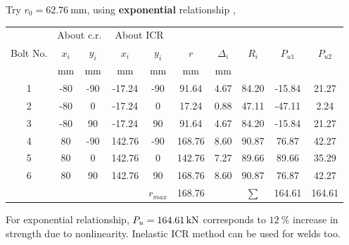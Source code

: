 \begin{solution}
Try $r_0=\SI{62.76}{\mm}$, using \textbf{exponential} relationship ,
\begin{table}[H]
\centering
\begin{tabular}{cccccccccc}
	\toprule
	         & \multicolumn{2}{c}{About c.r.} & \multicolumn{2}{c}{About ICR} &          &            &          &          &          \\
	Bolt No. &  $x_i$   &        $y_i$        &  $x_i$   &       $y_i$        &   $r$    & $\Delta_i$ &  $R_i$   & $P_{u1}$ & $P_{u2}$ \\
	         & \si{\mm} &      \si{\mm}       & \si{\mm} &      \si{\mm}      & \si{\mm} &  \si{\mm}  & \si{\kn} & \si{\kn} & \si{\kn} \\ \midrule
	   1     &   -80    &         -90         &  -17.24  &        -90         &  91.64   &    4.67    &  84.20   &  -15.84  &  21.27   \\
	   2     &   -80    &          0          &  -17.24  &         0          &  17.24   &    0.88    &  47.11   &  -47.11  &   2.24   \\
	   3     &   -80    &         90          &  -17.24  &         90         &  91.64   &    4.67    &  84.20   &  -15.84  &  21.27   \\
	   4     &    80    &         -90         &  142.76  &        -90         &  168.76  &    8.60    &  90.87   &  76.87   &  42.27   \\
	   5     &    80    &          0          &  142.76  &         0          &  142.76  &    7.27    &  89.66   &  89.66   &  35.29   \\
	   6     &    80    &         90          &  142.76  &         90         &  168.76  &    8.60    &  90.87   &  76.87   &  42.27   \\ \bottomrule
	         &          &                     &          &     $r_{max}$      &  168.76  &            &  $\sum$  &  164.61  &  164.61
\end{tabular}
\end{table}

For exponential relationship, $P_u=\SI{164.61}{\kilo\newton}$ corresponds to $\SI{12}{\percent}$ increase in strength due to nonlinearity.
Inelastic ICR method can be used for welds too.
\end{solution}

